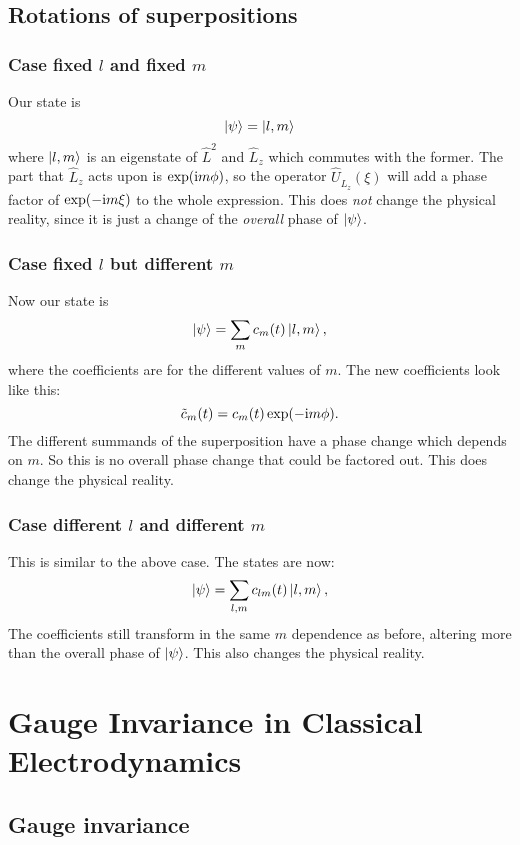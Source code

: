 \documentclass[11pt, ngerman, fleqn, DIV=15, headinclude, BCOR=1cm]{scrartcl}
\begin{document}
\subsection{Rotations of superpositions}

\subsubsection{Case fixed $l$ and fixed $m$}

Our state is
\[
    \ket \psi = \ket{l, m}
\]
where $\ket{l, m}$ is an eigenstate of $\hat L^2$ and $\hat L_z$ which commutes
with the former. The part that $\hat L_z$ acts upon is $\exp(\mathrm i m \phi)$, so
the operator $\hat U_{\hat L_z}(\xi)$ will add a phase factor of $\exp(- \mathrm i m
\xi)$ to the whole expression. This does \emph{not} change the physical
reality, since it is just a change of the \emph{overall} phase of $\ket \psi$.

\subsubsection{Case fixed $l$ but different $m$}

Now our state is
\[
    \ket \psi = \sum_m c_m(t) \ket{l, m},
\]
where the coefficients are for the different values of $m$. The new
coefficients look like this:
\[
    \tilde c_m(t) = c_m(t) \exp(-\mathrm i m \phi).
\]
The different summands of the superposition have a phase change which depends
on $m$. So this is no overall phase change that could be factored out. This
does change the physical reality.

\subsubsection{Case different $l$ and different $m$}

This is similar to the above case. The states are now:
\[
    \ket \psi = \sum_{l,m} c_{lm}(t) \ket{l, m},
\]
The coefficients still transform in the same $m$ dependence as before, altering
more than the overall phase of $\ket \psi$. This also changes the physical
reality.

\section{Gauge Invariance in Classical Electrodynamics}

\subsection{Gauge invariance}
\end{document}
